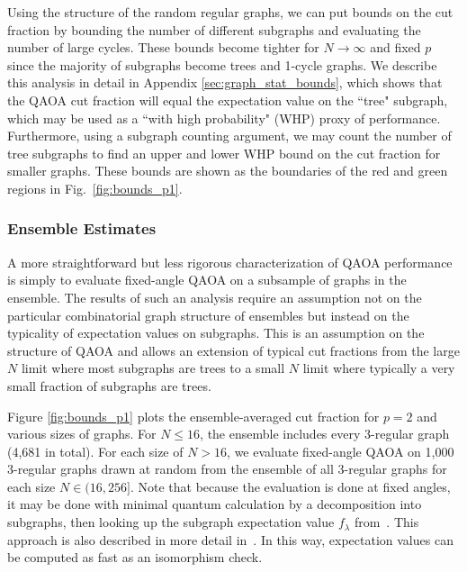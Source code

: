 Using the structure of the random regular graphs, we can put bounds on the cut fraction by bounding the number of different subgraphs and evaluating the number of large cycles. 
These bounds become  tighter for $N\longrightarrow\infty$ and fixed $p$ since the majority of subgraphs become trees and 1-cycle graphs.
We describe this analysis in detail in Appendix \ref{sec:graph_stat_bounds}, which shows that the QAOA cut fraction will equal the expectation value on the ``tree" subgraph, which may be used as a ``with high probability" (WHP) proxy of performance. Furthermore, using a subgraph counting argument, we may count the number of tree subgraphs to find an upper and lower WHP bound on the cut fraction for smaller graphs. These bounds are shown as the boundaries of the red and green regions in Fig.~\ref{fig:bounds_p1}.








\subsubsection{Ensemble Estimates}\label{sec:ensemble_estimates}

A more straightforward but less rigorous characterization of QAOA performance is simply to evaluate fixed-angle QAOA on a subsample of graphs in the ensemble. The results of such an analysis require an assumption not on the particular combinatorial graph structure of ensembles but instead on the typicality of expectation values on subgraphs. This is an assumption on the structure of QAOA and allows an extension of typical cut fractions from the large $N$ limit where most subgraphs are trees to a small $N$ limit where typically a very small fraction of subgraphs are trees.

Figure \ref{fig:bounds_p1} plots the ensemble-averaged cut fraction for $p=2$ and various sizes of graphs. For $N\leq 16$, the ensemble includes every 3-regular graph (4,681 in total). For each size of $N>16$, we evaluate fixed-angle QAOA on 1,000 3-regular graphs drawn at random from the ensemble of all 3-regular graphs for each size $N\in (16,256]$. Note that because the evaluation is done at fixed angles, it may be done with minimal quantum calculation by a decomposition into subgraphs, then looking up the subgraph expectation value $f_\lambda$ from~\cite{Wurtz_guarantee}. This approach is also described in more detail in~\cite{shaydulin2021}. In this way, expectation values can be computed as fast as an isomorphism check.

